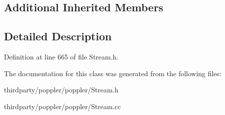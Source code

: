 \subsection*{Additional Inherited Members}


\subsection{Detailed Description}


Definition at line 665 of file Stream.\+h.



The documentation for this class was generated from the following files\+:\begin{DoxyCompactItemize}
\item 
thirdparty/poppler/poppler/Stream.\+h\item 
thirdparty/poppler/poppler/Stream.\+cc\end{DoxyCompactItemize}
